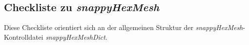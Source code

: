 \newpage
\subsection{Checkliste zu \textit{snappyHexMesh}}

Diese Checkliste orientiert sich an der allgemeinen Struktur der \textit{snappyHexMesh}-Kontrolldatei \textit{snappyHexMeshDict}.

